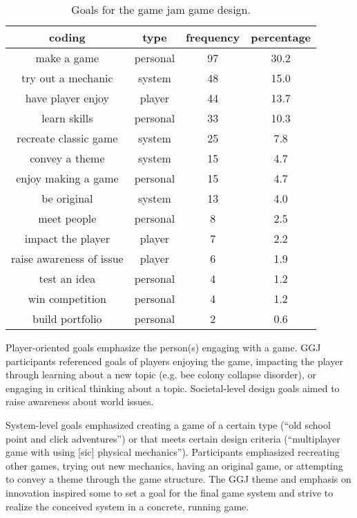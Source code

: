 \documentclass{sig-alternate}
\begin{document}
\begin{table}[tb]
\centering
\scriptsize
\begin{tabular}{|c|c|c|c|}
\hline coding & type & frequency & percentage \\ 
\hline make a game & personal & 97 & 30.2 \\ 
\hline try out a mechanic & system & 48 & 15.0 \\ 
\hline have player enjoy & player & 44 & 13.7 \\ 
\hline learn skills & personal & 33 & 10.3 \\ 
\hline recreate classic game & system & 25 & 7.8 \\ 
\hline convey a theme & system & 15 & 4.7 \\ 
\hline enjoy making a game & personal & 15 & 4.7 \\ 
\hline be original & system & 13 & 4.0 \\ 
\hline meet people & personal & 8 & 2.5 \\ 
\hline impact the player & player & 7 & 2.2 \\ 
\hline raise awareness of issue & player & 6 & 1.9 \\ 
\hline test an idea & personal & 4 & 1.2 \\ 
\hline win competition & personal & 4 & 1.2 \\ 
\hline build portfolio & personal & 2 & 0.6 \\ 
\hline 
\end{tabular} 
\caption{Goals for the game jam game design.}
\label{tab:goals}
\end{table}

Player-oriented goals emphasize the person(s) engaging with a game.
GGJ participants referenced goals of players enjoying the game, impacting the player through learning about a new topic (e.g. bee colony collapse disorder), or engaging in critical thinking about a topic. Societal-level design goals aimed to raise awareness about world issues.

System-level goals emphasized creating a game of a certain type (``old school point and click adventures'') or that meets certain design criteria (``multiplayer game with using [sic] physical mechanics''). Participants emphasized recreating other games, trying out new mechanics, having an original game, or attempting to convey a theme through the game structure. The GGJ theme and emphasis on innovation inspired some to set a goal for the final game system and strive to realize the conceived system in a concrete, running game.
\end{document}
